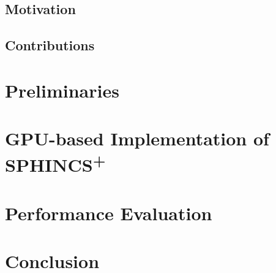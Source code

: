 \documentclass[journal]{IEEEtran}
\begin{document}
\subsection{Motivation}

\subsection{Contributions}



\section{Preliminaries}

\section{GPU-based Implementation of \texorpdfstring{SPHINCS\textsuperscript{+}}{SPHINCS+}}

\section{Performance Evaluation}

\section{Conclusion}

\color{black}


\end{document}
